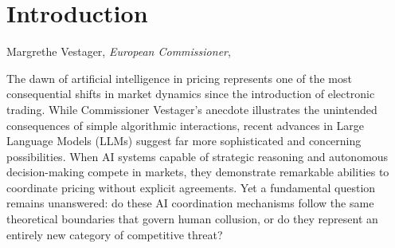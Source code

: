 \section{Introduction}\label{sec:intro}

\epigraph{}{Margrethe Vestager, \emph{European Commissioner}, ~\cite*{vestager_algorithms_2017}}


The dawn of artificial intelligence in pricing represents one of the most consequential shifts in market dynamics since the introduction of electronic trading. While Commissioner Vestager's anecdote illustrates the unintended consequences of simple algorithmic interactions, recent advances in Large Language Models (LLMs) suggest far more sophisticated and concerning possibilities. When AI systems capable of strategic reasoning and autonomous decision-making compete in markets, they demonstrate remarkable abilities to coordinate pricing without explicit agreements. Yet a fundamental question remains unanswered: do these AI coordination mechanisms follow the same theoretical boundaries that govern human collusion, or do they represent an entirely new category of competitive threat?


